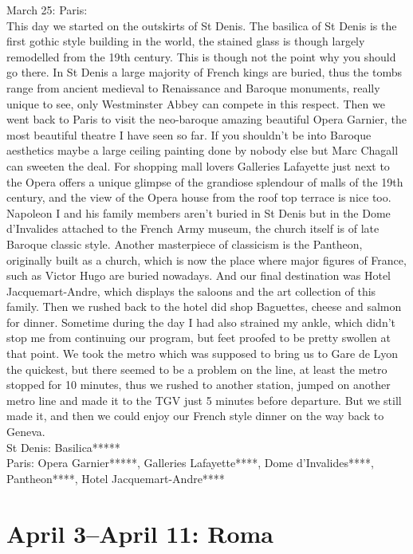 March 25: Paris:\\
This day we started on the outskirts of St Denis. The basilica of St Denis is the first gothic style building in the world, the stained glass is though largely remodelled from the 19th century. This is though not the point why you should go there. In St Denis a large majority of French kings are buried, thus the tombs range from ancient medieval to Renaissance and Baroque monuments, really unique to see, only Westminster Abbey can compete in this respect. Then we went back to Paris to visit the neo-baroque amazing beautiful Opera Garnier, the most beautiful theatre I have seen so far. If you shouldn't be into Baroque aesthetics maybe a large ceiling painting done by nobody else but Marc Chagall can sweeten the deal. For shopping mall lovers Galleries Lafayette just next to the Opera offers a unique glimpse of the grandiose splendour of malls of the 19th century, and the view of the Opera house from the roof top terrace is nice too. \\
Napoleon I and his family members aren't buried in St Denis but in the Dome d'Invalides attached to the French Army museum, the church itself is of late Baroque classic style. Another masterpiece of classicism is the Pantheon, originally built as a church, which is now the place where major figures of France, such as Victor Hugo are buried nowadays. And our final destination was Hotel Jacquemart-Andre, which displays the saloons and the art collection of this family. Then we rushed back to the hotel did shop Baguettes, cheese and salmon for dinner. Sometime during the day I had also strained my ankle, which didn't stop me from continuing our program, but feet proofed to be pretty swollen at that point. We took the metro which was supposed to bring us to Gare de Lyon the quickest, but there seemed to be a problem on the line, at least the metro stopped for 10 minutes, thus we rushed to another station, jumped on another metro line and made it to the TGV just 5 minutes before departure. But we still made it, and then we could enjoy our French style dinner on the way back to Geneva.\\

St Denis: Basilica*****\\
Paris: Opera Garnier*****, Galleries Lafayette****, Dome d'Invalides****, Pantheon****, Hotel Jacquemart-Andre****

\section{April 3--April 11: Roma}
\label{Roma2013}

